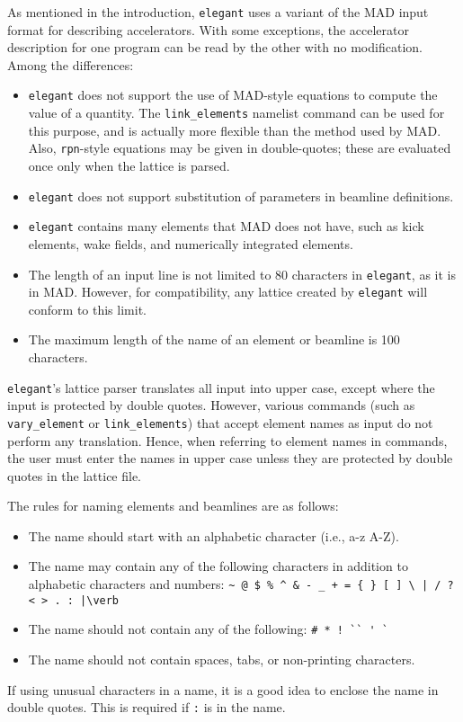 \documentclass[11pt]{article}
\begin{document}
As mentioned in the introduction, {\tt elegant} uses a variant of the
MAD input format for describing accelerators.  With some exceptions,
the accelerator description for one program can be read by the other
with no modification.  Among the differences:
\begin{itemize}
\item {\tt elegant} does not support the use of MAD-style equations to compute
the value of a quantity.  The \verb|link_elements| namelist command
can be used for this purpose, and is actually more flexible than the
method used by MAD.  Also, \verb|rpn|-style equations may be given
in double-quotes; these are evaluated once only when the lattice
is parsed.
\item {\tt elegant} does not support substitution of parameters in
beamline definitions.
\item {\tt elegant} contains many elements that MAD does not have, such
as kick elements, wake fields, and numerically integrated elements.
\item The length of an input line is not limited to 80 characters in 
{\tt elegant}, as it is in MAD.  However, for compatibility, any lattice
created by {\tt elegant} will conform to this limit.
\item The maximum length of the name of an element or beamline is 100 characters.
\end{itemize}

{\tt elegant}'s lattice parser translates all input into upper case,
except where the input is protected by double quotes.  However,
various commands (such as {\tt vary\_element} or {\tt link\_elements})
that accept element names as input do not perform any translation.
Hence, when referring to element names in commands, the user must
enter the names in upper case unless they are protected by double
quotes in the lattice file.  

The rules for naming elements and beamlines are as follows:
\begin{itemize}
\item The name should start with an alphabetic character (i.e., a-z A-Z).
\item The name may contain any of the following characters in addition to
alphabetic characters and numbers: 
\verb#~ @ $ % ^ & - _ + = { } [ ] \ | / ? < > . : |\verb#
\item The name should not contain any of the following: \verb|# * ! `` ' `|
\item The name should not contain spaces, tabs, or non-printing characters.
\end{itemize}
If using unusual characters in a name, it is a good idea to enclose the name
in double quotes.   This is required if \verb|:| is in the name.
\end{document}
